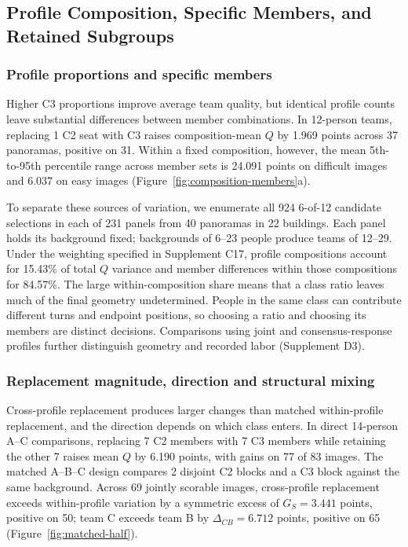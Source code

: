 \subsection{Profile Composition, Specific Members, and Retained Subgroups}
\label{sec:composition}
\subsubsection{Profile proportions and specific members}
\label{sec:composition-discussion-anchor}

Higher C3 proportions improve average team quality, but identical profile counts leave substantial differences between member combinations. In 12-person teams, replacing 1 C2 seat with C3 raises composition-mean $Q$ by 1.969 points across 37 panoramas, positive on 31. Within a fixed composition, however, the mean 5th-to-95th percentile range across member sets is 24.091 points on difficult images and 6.037 on easy images (Figure~\ref{fig:composition-members}a).



To separate these sources of variation, we enumerate all 924 6-of-12 candidate selections in each of 231 panels from 40 panoramas in 22 buildings. Each panel holds its background fixed; backgrounds of 6--23 people produce teams of 12--29. Under the weighting specified in Supplement C17, profile compositions account for 15.43\% of total $Q$ variance and member differences within those compositions for 84.57\%. The large within-composition share means that a class ratio leaves much of the final geometry undetermined. People in the same class can contribute different turns and endpoint positions, so choosing a ratio and choosing its members are distinct decisions. Comparisons using joint and consensus-response profiles further distinguish geometry and recorded labor (Supplement D3).

\subsubsection{Replacement magnitude, direction and structural mixing}

Cross-profile replacement produces larger changes than matched within-profile replacement, and the direction depends on which class enters. In direct 14-person A--C comparisons, replacing 7 C2 members with 7 C3 members while retaining the other 7 raises mean $Q$ by 6.190 points, with gains on 77 of 83 images. The matched A--B--C design compares 2 disjoint C2 blocks and a C3 block against the same background. Across 69 jointly scorable images, cross-profile replacement exceeds within-profile variation by a symmetric excess of $G_S=3.441$ points, positive on 50; team C exceeds team B by $\Delta_{CB}=6.712$ points, positive on 65 (Figure~\ref{fig:matched-half}).

